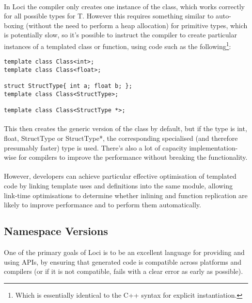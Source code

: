 \documentclass[12pt,twoside,notitlepage]{report}
\begin{document}
\paragraph{}
In Loci the compiler only creates one instance of the class, which works correctly for all possible types for T. However this requires something similar to auto-boxing (without the need to perform a heap allocation) for primitive types, which is potentially slow, so it's possible to instruct the compiler to create particular instances of a templated class or function, using code such as the following\footnote{Which is essentially identical to the C++ syntax for explicit instantiation.}:


\begin{lstlisting}
template class Class<int>;
template class Class<float>;

struct StructType{ int a; float b; };
template class Class<StructType>;

template class Class<StructType *>;
\end{lstlisting}


\paragraph{}
This then creates the generic version of the class by default, but if the type is int, float, StructType or StructType*, the corresponding specialised (and therefore presumably faster) type is used. There's also a lot of capacity implementation-wise for compilers to improve the performance without breaking the functionality.

\paragraph{}
However, developers can achieve particular effective optimisation of templated code by linking template uses and definitions into the same module, allowing link-time optimisations to determine whether inlining and function replication are likely to improve performance and to perform them automatically.

\clearpage

\subsection{Namespace Versions}

\paragraph{}
One of the primary goals of Loci is to be an excellent language for providing and using APIs, by ensuring that generated code is compatible across platforms and compilers (or if it is not compatible, fails with a clear error as early as possible).
\end{document}
